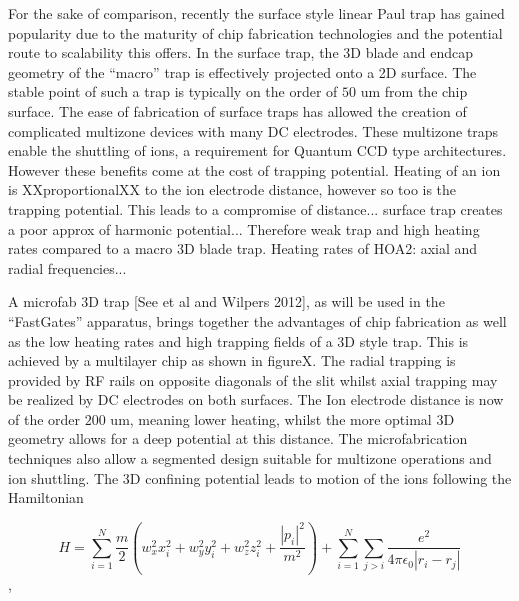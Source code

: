 \documentclass{article}
\begin{document}
For the sake of comparison, recently the surface style linear Paul
trap has gained popularity due to the maturity of chip fabrication
technologies and the potential route to scalability this offers. In
the surface trap, the 3D blade and endcap geometry of the ``macro''
trap is effectively projected onto a 2D surface. The stable point of
such a trap is typically on the order of $50$ um from the chip
surface. The ease of fabrication of surface traps has allowed the
creation of complicated multizone devices with many DC electrodes.
These multizone traps enable the shuttling of ions, a requirement for
Quantum CCD type architectures. However these benefits come at the
cost of trapping potential. Heating of an ion is XXproportionalXX to
the ion electrode distance, however so too is the trapping
potential. This leads to a compromise of distance... surface trap
creates a poor approx of harmonic potential... Therefore weak trap and
high heating rates compared to a macro 3D blade trap. Heating rates of
HOA2: axial and radial frequencies...

A microfab 3D trap [See et al and Wilpers 2012], as will be used in
the ``FastGates'' apparatus, brings together the advantages of chip
fabrication as well as the low heating rates and high trapping fields
of a 3D style trap. This is achieved by a multilayer chip as shown in
figureX. The radial trapping is provided by RF rails on opposite
diagonals of the slit whilst axial trapping may be realized by DC
electrodes on both surfaces. The Ion electrode distance is now of the
order $200$ um, meaning lower heating, whilst the more optimal 3D
geometry allows for a deep potential at this distance. The
microfabrication techniques also allow a segmented design suitable for
multizone operations and ion shuttling.  The 3D confining potential
leads to motion of the ions following the Hamiltonian

$$ H = \sum_{i=1}^N \frac{m}{2}(w_x^2x_i^2 + w_y^2y_i^2 + w_z^2z_i^2 + \frac{|p_i|^2}{m^2}) + \sum_{i=1}^N\sum_{j>i}\frac{e^2}{4\pi\epsilon_0|r_i - r_j|}$$,
\end{document}
